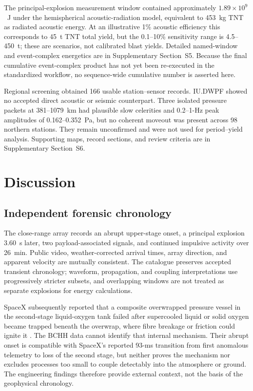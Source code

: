 \documentclass[]{seismica}
\begin{document}
The principal-explosion measurement window contained approximately
$1.89\times10^9$~J under the hemispherical acoustic-radiation model, equivalent
to 453~kg TNT as radiated acoustic energy. At an illustrative 1\% acoustic
efficiency this corresponds to 45~t TNT total yield, but the 0.1--10\%
sensitivity range is 4.5--450~t; these are scenarios, not calibrated blast
yields. Detailed named-window and event-complex energetics are in Supplementary
Section~S5. Because the final cumulative event-complex product has not yet
been re-executed in the standardized workflow, no sequence-wide cumulative
number is asserted here.

Regional screening obtained 166 usable station--sensor records. IU.DWPF showed
no accepted direct acoustic or seismic counterpart. Three isolated pressure
packets at 381--1079~km had plausible slow celerities and 0.2--1-Hz peak
amplitudes of 0.162--0.352~Pa, but no coherent moveout was present across 98
northern stations. They remain unconfirmed and were not used for period--yield
analysis. Supporting maps, record sections, and review criteria are in
Supplementary Section~S6.

\FloatBarrier

\section{Discussion}
\label{sec:discussion}

\subsection{Independent forensic chronology}

The close-range array records an abrupt upper-stage onset, a principal
explosion 3.60~s later, two payload-associated signals, and continued
impulsive activity over 26~min. Public video, weather-corrected arrival times,
array direction, and apparent velocity are mutually consistent. The catalogue
preserves accepted transient chronology; waveform, propagation, and coupling
interpretations use progressively stricter subsets, and overlapping windows
are not treated as separate explosions for energy calculations.

SpaceX subsequently reported that a composite overwrapped pressure vessel in
the second-stage liquid-oxygen tank failed after supercooled liquid or solid
oxygen became trapped beneath the overwrap, where fibre breakage or friction
could ignite it \citep{spacex_anomaly_2017,nasa_sma_falcon9}. The BCHH data
cannot identify that internal mechanism. Their abrupt onset is compatible with
SpaceX's reported 93-ms transition from first anomalous telemetry to loss of
the second stage, but neither proves the mechanism nor excludes processes too
small to couple detectably into the atmosphere or ground. The engineering
findings therefore provide external context, not the basis of the geophysical
chronology.
\end{document}
